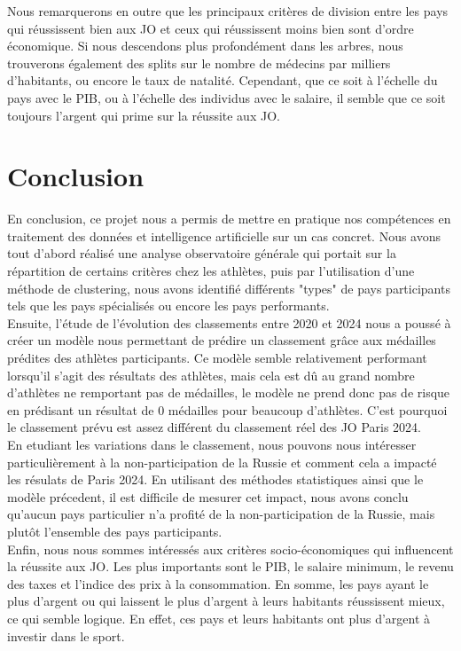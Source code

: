 \documentclass{article}
\begin{document}
Nous remarquerons en outre que les principaux critères de division entre les pays qui réussissent bien aux JO et ceux qui réussissent moins bien sont d'ordre économique. Si nous descendons plus profondément dans les arbres, nous trouverons également des splits sur le nombre de médecins par milliers d'habitants, ou encore le taux de natalité. Cependant, que ce soit à l'échelle du pays avec le PIB, ou à l'échelle des individus avec le salaire, il semble que ce soit toujours l'argent qui prime sur la réussite aux JO.

\section{Conclusion}
En conclusion, ce projet nous a permis de mettre en pratique nos compétences en traitement des données et intelligence artificielle sur un cas concret. Nous avons tout d’abord réalisé une analyse observatoire générale qui portait sur la répartition de certains critères chez les athlètes, puis par l'utilisation d'une méthode de clustering, nous avons identifié différents "types" de pays participants tels que les pays spécialisés ou encore les pays performants. \\

Ensuite, l'étude de l'évolution des classements entre 2020 et 2024 nous a poussé à créer un modèle nous permettant de prédire un classement grâce aux médailles prédites des athlètes participants. Ce modèle semble relativement performant lorsqu'il s'agit des résultats des athlètes, mais cela est dû au grand nombre d'athlètes ne remportant pas de médailles, le modèle ne prend donc pas de risque en prédisant un résultat de 0 médailles pour beaucoup d'athlètes. C'est pourquoi le classement prévu est assez différent du classement réel des JO Paris 2024. \\

En etudiant les variations dans le classement, nous pouvons nous intéresser particulièrement à la non-participation de la Russie et comment cela a impacté les résulats de Paris 2024. En utilisant des méthodes statistiques ainsi que le modèle précedent, il est difficile de mesurer cet impact, nous avons conclu qu'aucun pays particulier n'a profité de la non-participation de la Russie, mais plutôt l'ensemble des pays participants. \\

Enfin, nous nous sommes intéressés aux critères socio-économiques qui influencent la réussite aux JO. Les plus importants sont le PIB, le salaire minimum, le revenu des taxes et l'indice des prix à la consommation. En somme, les pays ayant le plus d'argent ou qui laissent le plus d'argent à leurs habitants réussissent mieux, ce qui semble logique. En effet, ces pays et leurs habitants ont plus d'argent à investir dans le sport.
\appendix
\end{document}
